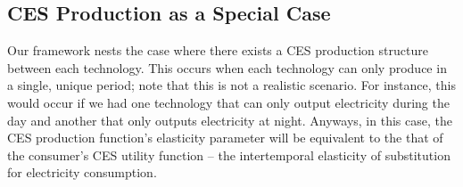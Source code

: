 \documentclass[11pt,a4paper]{extarticle}
\newenvironment{proof}[1][Proof]{\noindent\textbf{#1:} }{\ \rule{0.5em}{0.5em}}
\begin{document}
%

\subsection{CES Production as a Special Case}

\label{sec:CESspecialcase}

Our framework nests the case where there exists a CES production structure between each technology. This occurs when each technology can only produce in a single, unique period; note that this is not a realistic scenario. For instance, this would occur if we had one technology that can only output electricity during the day and another that only outputs electricity at night. Anyways, in this case, the CES production function's elasticity parameter  will be equivalent to the that of the consumer's CES utility function -- the intertemporal elasticity of substitution for electricity consumption. 
\end{document}
